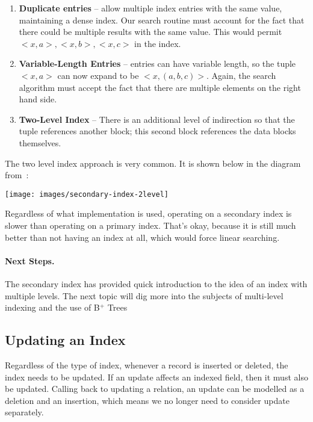 \begin{enumerate}
	\item \textbf{Duplicate entries} -- allow multiple index entries with the same value, maintaining a dense index. Our search routine must account for the fact that there could be multiple results with the same value. This would permit $<x, a>, <x, b>, <x, c>$ in the index.
	\item \textbf{Variable-Length Entries} -- entries can have variable length, so the tuple $<x, a>$ can now expand to be $<x, (a, b, c)>$. Again, the search algorithm must accept the fact that there are multiple elements on the right hand side.
	\item \textbf{Two-Level Index} -- There is an additional level of indirection so that the tuple references another block; this second block references the data blocks themselves.
\end{enumerate}

The two level index approach is very common. It is shown below in the diagram from~\cite{fds}: 

\begin{center}
\texttt{[image: images/secondary-index-2level]}
\end{center}

Regardless of what implementation is used, operating on a secondary index is slower than operating on a primary index. That's okay, because it is still much better than not having an index at all, which would force linear searching. 

\paragraph{Next Steps.}
The secondary index has provided quick introduction to the idea of an index with multiple levels. The next topic will dig more into the subjects of multi-level indexing and the use of B$^{+}$ Trees 

\subsection*{Updating an Index}

Regardless of the type of index, whenever a record is inserted or deleted, the index needs to be updated. If an update affects an indexed field, then it must also be updated. Calling back to updating a relation, an update can be modelled as a deletion and an insertion, which means we no longer need to consider update separately.

